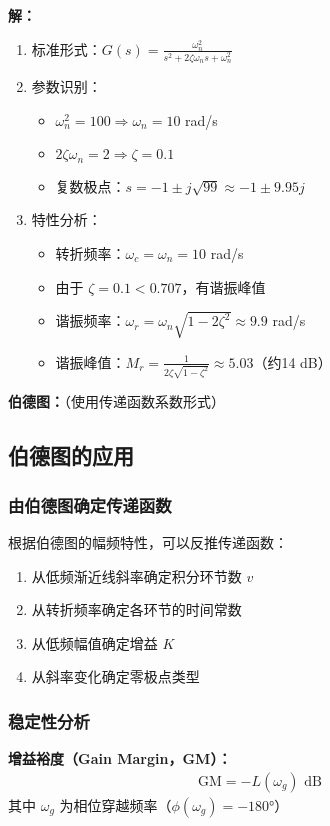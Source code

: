 \textbf{解：}
\begin{enumerate}
    \item 标准形式：$G(s) = \frac{\omega_n^2}{s^2 + 2\zeta\omega_n s + \omega_n^2}$
    \item 参数识别：
    \begin{itemize}
        \item $\omega_n^2 = 100 \Rightarrow \omega_n = 10$ rad/s
        \item $2\zeta\omega_n = 2 \Rightarrow \zeta = 0.1$
        \item 复数极点：$s = -1 \pm j\sqrt{99} \approx -1 \pm 9.95j$
    \end{itemize}
    \item 特性分析：
    \begin{itemize}
        \item 转折频率：$\omega_c = \omega_n = 10$ rad/s
        \item 由于 $\zeta = 0.1 < 0.707$，有谐振峰值
        \item 谐振频率：$\omega_r = \omega_n\sqrt{1-2\zeta^2} \approx 9.9$ rad/s
        \item 谐振峰值：$M_r = \frac{1}{2\zeta\sqrt{1-\zeta^2}} \approx 5.03$（约14 dB）
    \end{itemize}
\end{enumerate}

\textbf{伯德图：}（使用传递函数系数形式）
\begin{center}
\end{center}

\subsection{伯德图的应用}

\subsubsection{由伯德图确定传递函数}
根据伯德图的幅频特性，可以反推传递函数：
\begin{enumerate}
    \item 从低频渐近线斜率确定积分环节数 $v$
    \item 从转折频率确定各环节的时间常数
    \item 从低频幅值确定增益 $K$
    \item 从斜率变化确定零极点类型
\end{enumerate}

\subsubsection{稳定性分析}
\textbf{增益裕度（Gain Margin，GM）：}
\begin{align*}
\text{GM} = -L(\omega_g) \text{ dB}
\end{align*}
其中 $\omega_g$ 为相位穿越频率（$\phi(\omega_g) = -180°$）

